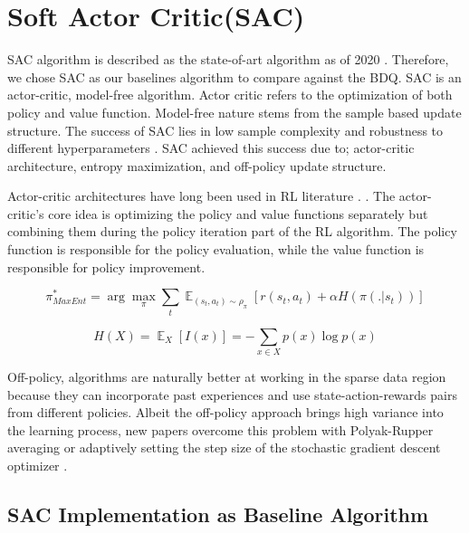 \section{Soft Actor Critic(SAC)}


SAC algorithm is described as the state-of-art algorithm as of 2020 \cite{stable-baselines}. Therefore, we chose SAC as our baselines algorithm to compare against the BDQ. SAC is an actor-critic, model-free algorithm. Actor critic refers to the optimization of both policy and value function. Model-free nature stems from the sample based update structure. The success of SAC lies in low sample complexity and robustness to different hyperparameters \cite{Haarnoja2018}. SAC achieved this success due to; actor-critic architecture, entropy maximization, and off-policy update structure.


Actor-critic architectures have long been used in RL literature \cite{Konda2000}. \cite{Haarnoja2018}. The actor-critic's core idea is optimizing the policy and value functions separately but combining them during the policy iteration part of the RL algorithm. The policy function is responsible for the policy evaluation, while the value function is responsible for policy improvement.


\begin{equation}
    \pi^*_{MaxEnt} = \arg\max_{\pi}\sum_t\mathop{\mathbb{E}}_{(s_t,a_t)\sim \rho_{\pi}}[r(s_t, a_t) + \alpha H(\pi(.|s_t))]
    \label{eq:maxentRL}
\end{equation}

\begin{equation}
    H(X) = \mathop{\mathbb{E}}_X [I(x)] = -\sum\limits_{x \in X} p(x)\log p(x)
\end{equation}

Off-policy, algorithms are naturally better at working in the sparse data region because they can incorporate past experiences and use state-action-rewards pairs from different policies.  Albeit the off-policy approach brings high variance into the learning process, new papers overcome this problem with Polyak-Rupper averaging or adaptively setting the step size of the stochastic gradient descent optimizer \cite{Sutton2018}.

\subsection{SAC Implementation as Baseline Algorithm}


